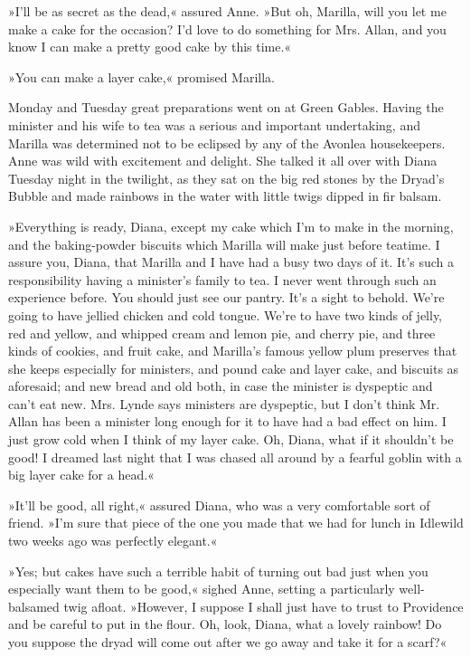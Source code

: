 »I'll be as secret as the dead,« assured Anne. »But oh, Marilla, will you let me make a cake for the occasion? I'd love to do something for Mrs. Allan, and you know I can make a pretty good cake by this time.«

»You can make a layer cake,« promised Marilla.

Monday and Tuesday great preparations went on at Green Gables. Having the minister and his wife to tea was a serious and important undertaking, and Marilla was determined not to be eclipsed by any of the Avonlea housekeepers. Anne was wild with excitement and delight. She talked it all over with Diana Tuesday night in the twilight, as they sat on the big red stones by the Dryad's Bubble and made rainbows in the water with little twigs dipped in fir balsam.

»Everything is ready, Diana, except my cake which I'm to make in the morning, and the baking-powder biscuits which Marilla will make just before teatime. I assure you, Diana, that Marilla and I have had a busy two days of it. It's such a responsibility having a minister's family to tea. I never went through such an experience before. You should just see our pantry. It's a sight to behold. We're going to have jellied chicken and cold tongue. We're to have two kinds of jelly, red and yellow, and whipped cream and lemon pie, and cherry pie, and three kinds of cookies, and fruit cake, and Marilla's famous yellow plum preserves that she keeps especially for ministers, and pound cake and layer cake, and biscuits as aforesaid; and new bread and old both, in case the minister is dyspeptic and can't eat new. Mrs. Lynde says ministers are dyspeptic, but I don't think Mr. Allan has been a minister long enough for it to have had a bad effect on him. I just grow cold when I think of my layer cake. Oh, Diana, what if it shouldn't be good! I dreamed last night that I was chased all around by a fearful goblin with a big layer cake for a head.«

»It'll be good, all right,« assured Diana, who was a very comfortable sort of friend. »I'm sure that piece of the one you made that we had for lunch in Idlewild two weeks ago was perfectly elegant.«

»Yes; but cakes have such a terrible habit of turning out bad just when you especially want them to be good,« sighed Anne, setting a particularly well-balsamed twig afloat. »However, I suppose I shall just have to trust to Providence and be careful to put in the flour. Oh, look, Diana, what a lovely rainbow! Do you suppose the dryad will come out after we go away and take it for a scarf?«

